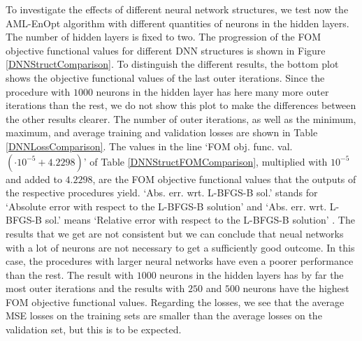 To investigate the effects of different neural network structures, we test now the AML-EnOpt algorithm with different quantities of neurons in the hidden layers. The number of hidden layers is fixed to two. The progression of the FOM objective functional values for different DNN structures is shown in Figure \ref{DNNStructComparison}. To distinguish the different results, the bottom plot shows the objective functional values of the last outer iterations. Since the procedure with $1000$ neurons in the hidden layer has here many more outer iterations than the rest, we do not show this plot to make the differences between the other results clearer. The number of outer iterations, as well as the minimum, maximum, and average training and validation losses are shown in Table \ref{DNNLossComparison}. The values in the line `FOM obj. func. val. $(\cdot 10^{-5}+4.2298)$' of Table \ref{DNNStructFOMComparison}, multiplied with $10^{-5}$ and added to $4.2298$, are the FOM objective functional values that the outputs of the respective procedures yield. `Abs. err. wrt. L-BFGS-B sol.' stands for `Absolute error with respect to the L-BFGS-B solution' and `Abs. err. wrt. L-BFGS-B sol.' means `Relative error with respect to the L-BFGS-B solution' . The results that we get are not consistent but we can conclude that neual networks with a lot of neurons are not necessary to get a sufficiently good outcome. In this case, the procedures with larger neural networks have even a poorer performance than the rest. The result with $1000$ neurons in the hidden layers has by far the most outer iterations and the results with $250$ and $500$ neurons have the highest FOM objective functional values. Regarding the losses, we see that the average MSE losses on the training sets are smaller than the average losses on the validation set, but this is to be expected.\\

